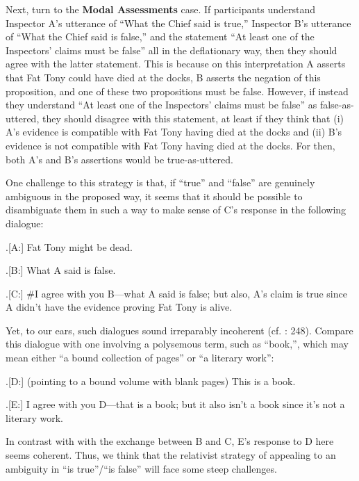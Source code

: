 \documentclass[11pt]{article}
\begin{document}
\begin{doublespace}
Next, turn to the {\bf Modal Assessments} case. If participants understand Inspector A's utterance of ``What the Chief said is true,'' Inspector B's utterance of ``What the Chief said is false,'' and the statement ``At least one of the Inspectors' claims must be false'' all in the deflationary way, then they should agree with the latter statement. This is because on this interpretation A asserts that Fat Tony could have died at the docks, B asserts the negation of this proposition, and one of these two propositions must be false. However, if instead they understand ``At least one of the Inspectors' claims must be false'' as false-as-uttered, they should disagree with this statement, at least if they think that (i) A's evidence is compatible with Fat Tony having died at the docks and (ii) B's evidence is not compatible with Fat Tony having died at the docks. For then, both A's and B's assertions would be true-as-uttered.

One challenge to this strategy is that, if ``true'' and ``false'' are genuinely ambiguous in the proposed way, it seems that it should be possible to disambiguate them in such a way to make sense of C's response in the following dialogue:

\ex.[A:] Fat Tony might be dead.

\ex.[B:] What A said is false.

\ex.[C:] {\#}I agree with you B---what A said is false; but also, A's claim is true since A didn't have the evidence proving Fat Tony is alive.  

Yet, to our ears, such dialogues sound irreparably incoherent (cf. \cite{macfarlane:2009}: 248). Compare this dialogue with one involving a polysemous term, such as ``book,'', which may mean either ``a bound collection of pages'' or ``a literary work'':

\ex.[D:] (pointing to a bound volume with blank pages) This is a book.

\ex.[E:] I agree with you D---that is a book; but it also isn't a book since it's not a literary work.

In contrast with with the exchange between B and C, E's response to D here seems coherent. Thus, we think that the relativist strategy of appealing to an ambiguity in ``is true''/``is false'' will face some steep challenges.


\end{doublespace}
\end{document}
